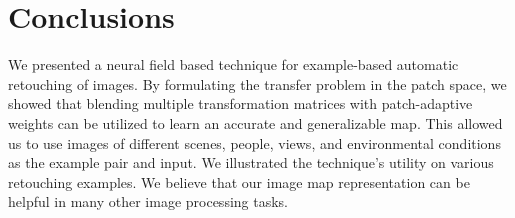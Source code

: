 










\section{Conclusions}
We presented a neural field based technique for example-based automatic retouching of images. By formulating the transfer problem in the patch space, we showed that blending multiple transformation matrices with patch-adaptive weights can be utilized to learn an accurate and generalizable map. This allowed us to use images of different scenes, people, views, and environmental conditions as the example pair and input. We illustrated the technique's utility on various retouching examples. We believe that our image map representation can be helpful in many other image processing tasks.


